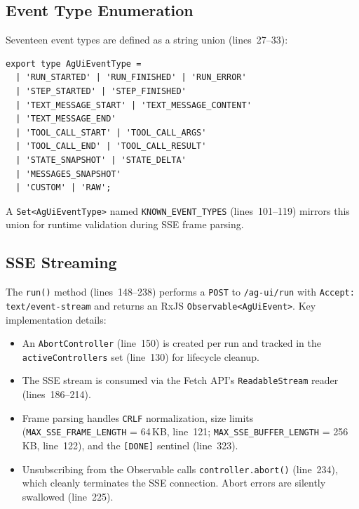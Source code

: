 \documentclass[11pt]{article}
\begin{document}
\subsection{Event Type Enumeration}

Seventeen event types are defined as a string union (lines~27--33):

\begin{lstlisting}[language={[Sharp]C},caption={AG-UI event types (sac-ag-ui.service.ts:27--33)}]
export type AgUiEventType =
  | 'RUN_STARTED' | 'RUN_FINISHED' | 'RUN_ERROR'
  | 'STEP_STARTED' | 'STEP_FINISHED'
  | 'TEXT_MESSAGE_START' | 'TEXT_MESSAGE_CONTENT'
  | 'TEXT_MESSAGE_END'
  | 'TOOL_CALL_START' | 'TOOL_CALL_ARGS'
  | 'TOOL_CALL_END' | 'TOOL_CALL_RESULT'
  | 'STATE_SNAPSHOT' | 'STATE_DELTA'
  | 'MESSAGES_SNAPSHOT'
  | 'CUSTOM' | 'RAW';
\end{lstlisting}

\noindent A \texttt{Set<AgUiEventType>} named \texttt{KNOWN\_EVENT\_TYPES}
(lines~101--119) mirrors this union for runtime validation during SSE frame
parsing.

\subsection{SSE Streaming}

The \texttt{run()} method (lines~148--238) performs a \texttt{POST} to
\texttt{/ag-ui/run} with \texttt{Accept: text/event-stream} and returns an
RxJS \texttt{Observable<AgUiEvent>}. Key implementation details:

\begin{itemize}
  \item An \texttt{AbortController} (line~150) is created per run and tracked
        in the \texttt{activeControllers} set (line~130) for lifecycle cleanup.
  \item The SSE stream is consumed via the Fetch API's
        \texttt{ReadableStream} reader (lines~186--214).
  \item Frame parsing handles \texttt{CRLF} normalization, size limits
        (\texttt{MAX\_SSE\_FRAME\_LENGTH} = 64\,KB, line~121;
        \texttt{MAX\_SSE\_BUFFER\_LENGTH} = 256\,KB, line~122), and the
        \texttt{[DONE]} sentinel (line~323).
  \item Unsubscribing from the Observable calls \texttt{controller.abort()}
        (line~234), which cleanly terminates the SSE connection. Abort errors
        are silently swallowed (line~225).
\end{itemize}
\end{document}

